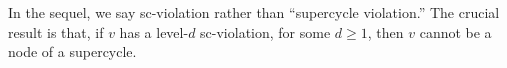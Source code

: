 


In the sequel, we say sc-violation rather than ``supercycle violation.''  The crucial result is
that, if $v$ has a level-$d$ sc-violation, for some $d \ge 1$, then $v$ cannot be a node of a
supercycle.



